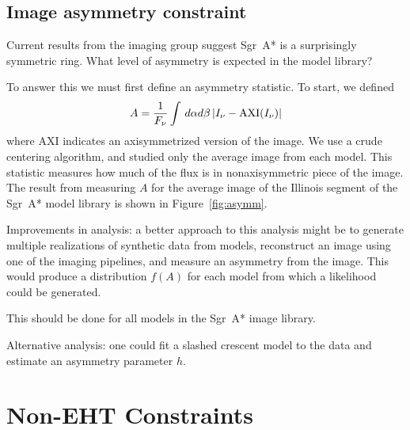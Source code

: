 \documentclass[twocolumn,tighten,dvipsnames]{aastex63}
\newcommand\sgra{Sgr~A*\xspace}
\newcommand\Rh{R_\mathrm{high}}
\newcommand\<{{\langle}}
\renewcommand\>{{\rangle}} %
\begin{document}
\subsection{Image asymmetry constraint}
\label{sec:asymconst}

Current results from the imaging group suggest \sgra is a surprisingly symmetric ring.   What level of asymmetry is expected in the model library?

To answer this we must first define an asymmetry statistic.  To start, we defined
\begin{equation}
    A = \frac{1}{F_\nu} \int \, d\alpha d\beta \, | I_\nu - {\rm AXI}(I_\nu) |
\end{equation}
where AXI indicates an axisymmetrized version of the image.  We use a crude centering algorithm, and studied only the average image from each model.  This statistic measures how much of the flux is in nonaxisymmetric piece of the image.   The result from measuring $A$ for the average image of the Illinois segment of the \sgra model library is shown in Figure~\ref{fig:asymm}.

\begin{figure*}
  \caption{Asymmetry statistic $A$ for models in the \sgra image library.  Lower $A$ is more symmetric.  All models are more symmetric when viewed nearly face on (or anti-face-on).  The $\Rh = 1$ models exhibit distinct trends and the models will likely be eliminated by other considerations.  For $\Rh \ge 10$ SANE edge-on models are most asymmetric at high positive spin, while the MAD edge-on models are most asymmetric at moderate negative spin.}
  \label{fig:asymm}
\end{figure*}

Improvements in analysis: a better approach to this analysis might be to generate multiple realizations of synthetic data from models, reconstruct an image using one of the imaging pipelines, and measure an asymmetry from the image.  This would produce a distribution $f(A)$ for each model from which a likelihood could be generated.

This should be done for all models in the \sgra image library.

Alternative analysis: one could fit a slashed crescent model to the data and estimate an asymmetry parameter $h$.

\section{Non-EHT Constraints}
\label{sec:nonehtconst}
\end{document}
